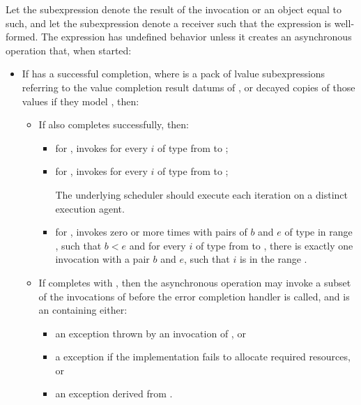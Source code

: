 \pnum
Let the subexpression  denote
the result of the invocation
 or
an object equal to such, and
let the subexpression  denote a receiver
such that the expression  is well-formed.
The expression  has undefined behavior
unless it creates an asynchronous operation that,
when started:

\begin{itemize}
\item
If  has a successful completion, where
 is a pack of lvalue subexpressions
referring to the value completion result datums of , or
decayed copies of those values if they model ,
then:

  \begin{itemize}
  \item
  If  also completes successfully, then:

    \begin{itemize}
    \item
    for ,
    invokes  for every $i$ of type 
    from  to ;

    \item
    for ,
    invokes  for every $i$ of type 
    from  to ;

    \recommended
    The underlying scheduler should execute each iteration
    on a distinct execution agent.

    \item
    for ,
    invokes  zero or more times
    with pairs of $b$ and $e$ of type 
    in range ,
    such that $b < e$ and
    for every $i$ of type  from  to ,
    there is exactly one invocation with a pair $b$ and $e$,
    such that $i$ is in the range .
    \end{itemize}

  \item
  If  completes with , then
  the asynchronous operation may invoke a subset of
  the invocations of 
  before the error completion handler is called, and
   is an  containing either:
    \begin{itemize}
    \item
    an exception thrown by an invocation of , or
    \item
    a  exception if
    the implementation fails to allocate required resources, or
    \item
    an exception derived from .
    \end{itemize}


\end{itemize}
\end{itemize}
